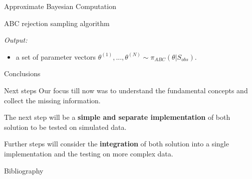 \documentclass{beamer}
\begin{document}
\begin{section}{Approximate Bayesian Computation}
\begin{frame}{ABC rejection sampling algorithm}
{			\emph{Output:}
			\begin{itemize}
				\item a set of parameter vectors $\theta ^ {(1)},..., \theta ^ {(N)} \sim \pi_{ABC}(\theta |S_{obs})$.
			\end{itemize}
		}
		

	\end{frame}
\end{section}

\begin{section}{Conclusions}
	
    \begin{frame}[plain]{}
		\sectionpage
	\end{frame}

	\begin{frame}{Next steps}
		Our focus till now was to understand the fundamental concepts and collect the missing information.
		
		\vspace{0.5 cm}
		The next step will be a \textbf{simple and separate implementation} of both solution to be tested on simulated data.
		
		\vspace{0.5 cm}
		Further steps will consider the \textbf{integration} of both solution into a single implementation and the testing on more complex data.
	\end{frame}

	\begin{frame}{Bibliography}
		\nocite{*}
		
		\tiny{  }

	

	\end{frame}
\end{section}
\end{document}
